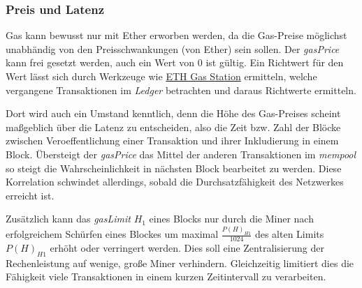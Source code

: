\documentclass[runningheads]{llncs}
\begin{document}
\subsubsection{Preis und Latenz}
Gas kann bewusst nur mit Ether erworben werden, da die Gas-Preise möglichst unabhändig von den Preisschwankungen (von Ether) sein sollen. Der \textit{gasPrice} kann frei gesetzt werden, auch ein Wert von 0 ist gültig. Ein Richtwert für den Wert lässt sich durch Werkzeuge wie \href{https://www.ethgasstation.info/}{ETH Gas Station} ermitteln, welche vergangene Transaktionen im \textit{Ledger} betrachten und daraus Richtwerte ermitteln.

Dort wird auch ein Umstand kenntlich, denn die Höhe des Gas-Preises scheint maßgeblich über die Latenz zu entscheiden, also die Zeit bzw. Zahl der Blöcke zwischen Veroeffentlichung einer Transaktion und ihrer Inkludierung in einem Block. Übersteigt der \textit{gasPrice} das Mittel der anderen Transaktionen im \textit{mempool} so steigt die Wahrscheinlichkeit in nächsten Block bearbeitet zu werden. Diese Korrelation schwindet allerdings, sobald die Durchsatzfähigkeit des Netzwerkes erreicht ist.

Zusätzlich kann das \textit{gasLimit} $ H_1 $ eines Blocks nur durch die Miner nach erfolgreichem Schürfen eines Blockes um maximal $ \frac{P(H)_{H1}}{1024} $ des alten Limits  $ P(H)_{H1} $ erhöht oder verringert werden. Dies soll eine Zentralisierung der Rechenleistung auf wenige, große Miner verhindern. Gleichzeitig limitiert dies die Fähigkeit viele Transaktionen in einem kurzen Zeitintervall zu verarbeiten.
\end{document}
